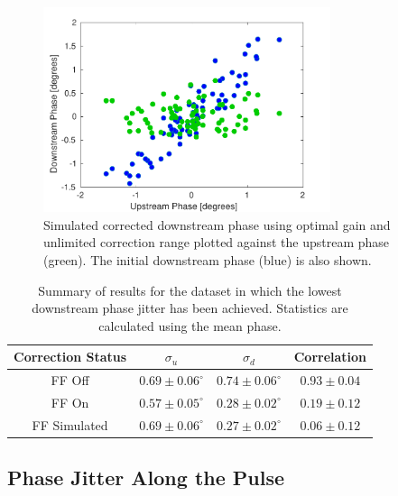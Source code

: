 \begin{figure}
  \centering
  \includegraphics[width=0.75\textwidth]{Figures/feedforward/BestFF_Simulated}
  \caption{Simulated corrected downstream phase using optimal gain and unlimited correction range plotted against the upstream phase (green). The initial downstream phase (blue) is also shown. }
  \label{f:BestFF_Simulated}
\end{figure}


\begin{table}
  \begin{center}
    \begin{tabular}{| c c c c |}
	   \hline
       Correction Status & \(\sigma_u\) & \(\sigma_d\) & Correlation \\ \hline
       FF Off & \(0.69\pm0.06^\circ\) & \(0.74\pm0.06^\circ\) & \(0.93\pm0.04\) \\
	   FF On & \(0.57\pm0.05^\circ\) & \(0.28\pm0.02^\circ\) & \(0.19\pm0.12\) \\
	   FF Simulated & \(0.69\pm0.06^\circ\) & \(0.27\pm0.02^\circ\) & \(0.06\pm0.12\) \\ \hline
    \end{tabular}
    \caption{Summary of results for the dataset in which the lowest downstream phase jitter has been achieved. Statistics are calculated using the mean phase.}
  	\label{t:BestFF}
  \end{center}
\end{table}

\subsection{Phase Jitter Along the Pulse}
\label{ss:bestJitterAlong}

